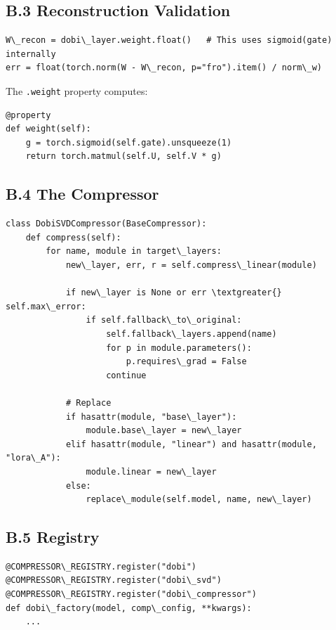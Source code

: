 \subsection{B.3 Reconstruction Validation}

\begin{lstlisting}
W\_recon = dobi\_layer.weight.float()   # This uses sigmoid(gate) internally
err = float(torch.norm(W - W\_recon, p="fro").item() / norm\_w)
\end{lstlisting}

The \texttt{.weight} property computes:

\begin{lstlisting}
@property
def weight(self):
    g = torch.sigmoid(self.gate).unsqueeze(1)
    return torch.matmul(self.U, self.V * g)
\end{lstlisting}

\subsection{B.4 The Compressor}

\begin{lstlisting}
class DobiSVDCompressor(BaseCompressor):
    def compress(self):
        for name, module in target\_layers:
            new\_layer, err, r = self.compress\_linear(module)
            
            if new\_layer is None or err \textgreater{} self.max\_error:
                if self.fallback\_to\_original:
                    self.fallback\_layers.append(name)
                    for p in module.parameters():
                        p.requires\_grad = False
                    continue
            
            # Replace
            if hasattr(module, "base\_layer"):
                module.base\_layer = new\_layer
            elif hasattr(module, "linear") and hasattr(module, "lora\_A"):
                module.linear = new\_layer
            else:
                replace\_module(self.model, name, new\_layer)
\end{lstlisting}

\subsection{B.5 Registry}

\begin{lstlisting}
@COMPRESSOR\_REGISTRY.register("dobi")
@COMPRESSOR\_REGISTRY.register("dobi\_svd")
@COMPRESSOR\_REGISTRY.register("dobi\_compressor")
def dobi\_factory(model, comp\_config, **kwargs):
    ...
\end{lstlisting}

